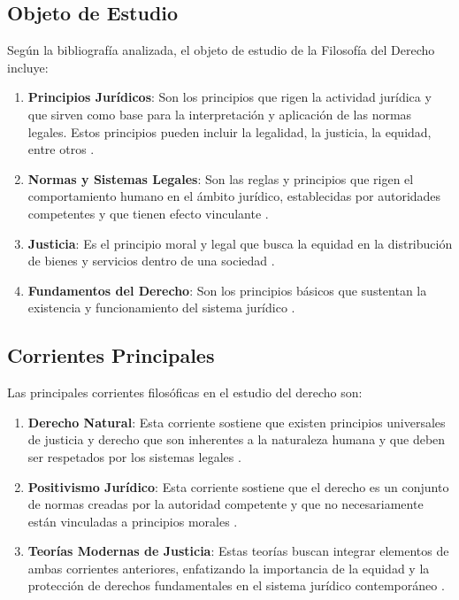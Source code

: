 \documentclass[
	spanish, %
	letterpaper, oneside
]{article}
\begin{document}
\subsection{Objeto de Estudio}

Según la bibliografía analizada, el objeto de estudio de la Filosofía del Derecho incluye:

\begin{enumerate}
	\item \textbf{Principios Jurídicos}: Son los principios que rigen la actividad jurídica y que sirven como base para la interpretación y aplicación de las normas legales. Estos principios pueden incluir la legalidad, la justicia, la equidad, entre otros \cite{finnis_estudios_2017,lovon_manual_2020}.
	\item \textbf{Normas y Sistemas Legales}: Son las reglas y principios que rigen el comportamiento humano en el ámbito jurídico, establecidas por autoridades competentes y que tienen efecto vinculante \cite{rojas_gonzalez_filosofia_derecho_2018,gandara_ley_2015}.
	\item \textbf{Justicia}: Es el principio moral y legal que busca la equidad en la distribución de bienes y servicios dentro de una sociedad \cite{finnis_estudios_2017,lovon_manual_2020}.
	\item \textbf{Fundamentos del Derecho}: Son los principios básicos que sustentan la existencia y funcionamiento del sistema jurídico \cite{ruiz_rodriguez_filosofia_derecho_2009,gandara_ley_2015}.
\end{enumerate}

\subsection{Corrientes Principales}

Las principales corrientes filosóficas en el estudio del derecho son:

\begin{enumerate}
	\item \textbf{Derecho Natural}: Esta corriente sostiene que existen principios universales de justicia y derecho que son inherentes a la naturaleza humana y que deben ser respetados por los sistemas legales \cite{finnis_estudios_2017}.
	\item \textbf{Positivismo Jurídico}: Esta corriente sostiene que el derecho es un conjunto de normas creadas por la autoridad competente y que no necesariamente están vinculadas a principios morales \cite{ruiz_rodriguez_filosofia_derecho_2009}.
	\item \textbf{Teorías Modernas de Justicia}: Estas teorías buscan integrar elementos de ambas corrientes anteriores, enfatizando la importancia de la equidad y la protección de derechos fundamentales en el sistema jurídico contemporáneo \cite{lovon_manual_2020,gandara_ley_2015}.
\end{enumerate}
\end{document}
